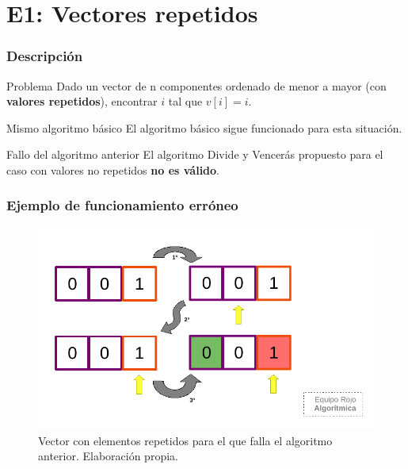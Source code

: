 \documentclass[13pt]{beamer}
\begin{document}
    \section{E1: Vectores repetidos}

    \begin{frame}
        \frametitle{Descripción}
        \begin{block}{Problema}
            Dado un vector de n componentes ordenado de menor a mayor (con \textbf{valores repetidos}), 
            encontrar $i$ tal que $v[i] = i$. 
        \end{block}

        \begin{block}{Mismo algoritmo básico}
            El algoritmo básico sigue funcionado para esta situación.
        \end{block}

        \begin{alertblock}{Fallo del algoritmo anterior}
            El algoritmo Divide y Vencerás propuesto para el caso con valores no repetidos \textbf{no es válido}.
        \end{alertblock}
    \end{frame}

    \begin{frame}
        \frametitle{Ejemplo de funcionamiento erróneo}
        \begin{figure}
            \centering
            \includegraphics[scale=0.81]{img/esquema_fallo1a.pdf}
            \caption{Vector con elementos repetidos para el que falla 
            el algoritmo anterior. Elaboración propia.}
            \label{fig:fallo-1a}
        \end{figure}
    \end{frame}
\end{document}
